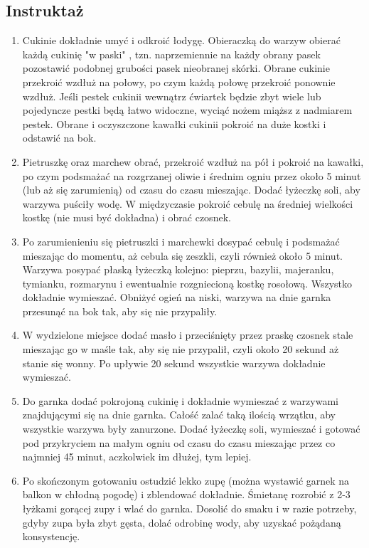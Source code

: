 \documentclass[a4paper,10pt]{book}
\begin{document}
\vspace{0.5cm} 

\subsection*{Instruktaż}
\begin{enumerate}
    \item Cukinie dokładnie umyć i odkroić łodygę. Obieraczką do warzyw obierać każdą cukinię "w paski" , tzn. naprzemiennie na każdy obrany pasek pozostawić podobnej grubości pasek nieobranej skórki. Obrane cukinie przekroić wzdłuż na połowy, po czym każdą połowę przekroić ponownie wzdłuż. Jeśli pestek cukinii wewnątrz ćwiartek będzie zbyt wiele lub pojedyncze pestki będą łatwo widoczne, wyciąć nożem miąższ z nadmiarem pestek. Obrane i oczyszczone kawałki cukinii pokroić na duże kostki i odstawić na bok.
    \item Pietruszkę oraz marchew obrać, przekroić wzdłuż na pół i pokroić na kawałki, po czym podsmażać na rozgrzanej oliwie i średnim ogniu przez około 5 minut (lub aż się zarumienią) od czasu do czasu mieszając. Dodać łyżeczkę soli, aby warzywa puściły wodę. W międzyczasie pokroić cebulę na średniej wielkości kostkę (nie musi być dokładna) i obrać czosnek.
    \item Po zarumienieniu się pietruszki i marchewki dosypać cebulę i podsmażać mieszając do momentu, aż cebula się zeszkli, czyli również około 5 minut. Warzywa posypać płaską łyżeczką kolejno: pieprzu, bazylii, majeranku, tymianku, rozmarynu i ewentualnie rozgniecioną kostkę rosołową. Wszystko dokładnie wymieszać. Obniżyć ogień na niski, warzywa na dnie garnka przesunąć na bok tak, aby się nie przypaliły.
    \item W wydzielone miejsce dodać masło i przeciśnięty przez praskę czosnek stale mieszając go w maśle tak, aby się nie przypalił, czyli około 20 sekund aż stanie się wonny. Po upływie 20 sekund wszystkie warzywa dokładnie wymieszać.
    \item Do garnka dodać pokrojoną cukinię i dokładnie wymieszać z warzywami znajdującymi się na dnie garnka. Całość zalać taką ilością wrzątku, aby wszystkie warzywa były zanurzone. Dodać łyżeczkę soli, wymieszać i gotować pod przykryciem na małym ogniu od czasu do czasu mieszając przez co najmniej 45 minut, aczkolwiek im dłużej, tym lepiej.
    \item Po skończonym gotowaniu ostudzić lekko zupę (można wystawić garnek na balkon w chłodną pogodę) i zblendować dokładnie. Śmietanę rozrobić z 2-3 łyżkami gorącej zupy i wlać do garnka. Dosolić do smaku i w razie potrzeby, gdyby zupa była zbyt gęsta, dolać odrobinę wody, aby uzyskać pożądaną konsystencję. 
\end{enumerate}
\end{document}
